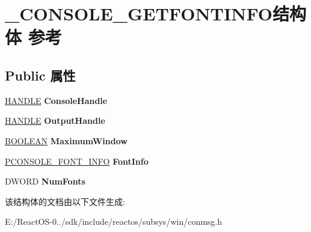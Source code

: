 \hypertarget{struct___c_o_n_s_o_l_e___g_e_t_f_o_n_t_i_n_f_o}{}\section{\+\_\+\+C\+O\+N\+S\+O\+L\+E\+\_\+\+G\+E\+T\+F\+O\+N\+T\+I\+N\+F\+O结构体 参考}
\label{struct___c_o_n_s_o_l_e___g_e_t_f_o_n_t_i_n_f_o}
\subsection*{Public 属性}
\begin{DoxyCompactItemize}
\item 
\mbox{\label{struct___c_o_n_s_o_l_e___g_e_t_f_o_n_t_i_n_f_o_a27a369a562953179a079b484a36630e7}} 
\hyperlink{interfacevoid}{H\+A\+N\+D\+LE} {\bfseries Console\+Handle}
\item 
\mbox{\label{struct___c_o_n_s_o_l_e___g_e_t_f_o_n_t_i_n_f_o_ad5d39ed07270804045665c4e0e613a5c}} 
\hyperlink{interfacevoid}{H\+A\+N\+D\+LE} {\bfseries Output\+Handle}
\item 
\mbox{\label{struct___c_o_n_s_o_l_e___g_e_t_f_o_n_t_i_n_f_o_a3d92109cc61b0eca9513510989ed0aa4}} 
\hyperlink{_processor_bind_8h_a112e3146cb38b6ee95e64d85842e380a}{B\+O\+O\+L\+E\+AN} {\bfseries Maximum\+Window}
\item 
\mbox{\label{struct___c_o_n_s_o_l_e___g_e_t_f_o_n_t_i_n_f_o_aff33e69d2980938c32011b6622f3a22a}} 
\hyperlink{struct___c_o_n_s_o_l_e___f_o_n_t___i_n_f_o}{P\+C\+O\+N\+S\+O\+L\+E\+\_\+\+F\+O\+N\+T\+\_\+\+I\+N\+FO} {\bfseries Font\+Info}
\item 
\mbox{\label{struct___c_o_n_s_o_l_e___g_e_t_f_o_n_t_i_n_f_o_a0ae4596b6f8b8ee8ce9647cec8d62f39}} 
D\+W\+O\+RD {\bfseries Num\+Fonts}
\end{DoxyCompactItemize}


该结构体的文档由以下文件生成\+:\begin{DoxyCompactItemize}
\item 
E\+:/\+React\+O\+S-\/0../sdk/include/reactos/subsys/win/conmsg.\+h\end{DoxyCompactItemize}

